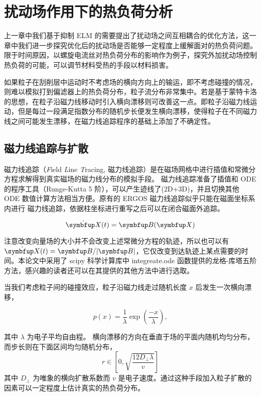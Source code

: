 \chapter{扰动场作用下的热负荷分析}



上一章中我们基于抑制 ELM 的需要提出了扰动场之间互相耦合的优化方法，这一章中我们进一步探究优化后的扰动场是否能够一定程度上缓解\Hmode 面对的热负荷问题。限于时间原因，以螺旋电流丝对热负荷分布的影响作为例子，探究外加扰动场控制热负荷的可能，可以调节材料受热的手段以材料损害。


如果粒子在刮削层中运动时不考虑场的横向方向上的输运，即不考虑碰撞的情况，则难以模拟打到偏滤器上的热负荷分布，粒子流分布非常集中。若是基于蒙特卡洛的思想，在粒子沿磁力线移动时引入横向漂移则可改善这一点。即粒子沿磁力线运动，但是每过一段满足指数分布的随机步长便发生横向漂移，使得粒子在不同磁力线之间可能发生漂移，在磁力线追踪程序的基础上添加了不确定性。

\section{磁力线追踪与扩散}

  
磁力线追踪（\textit{F}ield \textit{L}ine \textit{T}racing, 磁力线追踪）是在磁场网格中进行插值和常微分方程求解得到真实磁场的磁力线分布的模拟手段。
磁力线追踪准备了插值和 ODE 的程序工具（Runge-Kutta 5 阶），可以产生迹线了(2D+3D)，并且切换其他 ODE 数值计算方法相当方便。原有的 ERGOS 磁力线追踪似乎只能在磁面坐标系内进行 磁力线追踪，依据柱坐标进行重写之后可以在闭合磁面外追踪。


$$\dot{\vect{X}}(t) = \vect{B}(\vect{X}) $$

注意改变向量场的大小并不会改变上述常微分方程的轨迹，所以也可以有 $\dot{\vect{X}}(t) = \vect{B}/|\vect{B}| $，它仅改变到达轨迹上某点需要的时间。本论文中采用了 scipy 科学计算库中 integreate.ode 函数提供的龙格-库塔五阶方法，感兴趣的读者还可以在其提供的其他方法中进行选取。


当我们考虑粒子间的碰撞效应，粒子沿磁力线走过随机长度 $x$ 后发生一次横向漂移，

\begin{equation}
    p(x)=\frac{1}{\lambda} \exp \left(\frac{-x}{\lambda}\right),
\end{equation}

其中 $\lambda$ 为电子平均自由程。
横向漂移的方向在垂直于场的平面内随机均匀分布，而步长则在下面区间均匀随机分布，
\begin{equation}
  r \in[0, \sqrt{\frac{12 D_{\perp} \lambda}{v}}]
\end{equation}
其中 $D_{\perp}$ 为唯象的横向扩散系数而 $v$ 是电子速度。通过这种手段加入粒子扩散的因素可以一定程度上估计真实的热负荷分布。





